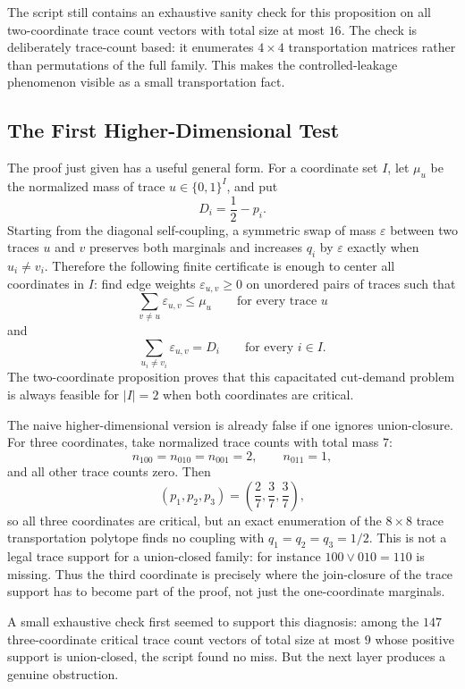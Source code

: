 \documentclass[11pt]{article}
\begin{document}
The script still contains an exhaustive sanity check for this proposition on
all two-coordinate trace count vectors with total size at most $16$.  The
check is deliberately trace-count based: it enumerates $4\times4$
transportation matrices rather than permutations of the full family.  This
makes the controlled-leakage phenomenon visible as a small transportation
fact.

\subsection{The First Higher-Dimensional Test}

The proof just given has a useful general form.  For a coordinate set $I$,
let $\mu_u$ be the normalized mass of trace $u\in\{0,1\}^I$, and put
\[
  D_i=\frac12-p_i.
\]
Starting from the diagonal self-coupling, a symmetric swap of mass
$\varepsilon$ between two traces $u$ and $v$ preserves both marginals and
increases $q_i$ by $\varepsilon$ exactly when $u_i\neq v_i$.  Therefore the
following finite certificate is enough to center all coordinates in $I$: find
edge weights $\varepsilon_{u,v}\geq0$ on unordered pairs of traces such that
\[
  \sum_{v\neq u}\varepsilon_{u,v}\leq \mu_u
  \qquad\text{for every trace }u
\]
and
\[
  \sum_{u_i\neq v_i}\varepsilon_{u,v}=D_i
  \qquad\text{for every }i\in I.
\]
The two-coordinate proposition proves that this capacitated cut-demand problem
is always feasible for $|I|=2$ when both coordinates are critical.

The naive higher-dimensional version is already false if one ignores
union-closure.
For three coordinates, take normalized trace counts with total mass $7$:
\[
  n_{100}=n_{010}=n_{001}=2,\qquad
  n_{011}=1,
\]
and all other trace counts zero.  Then
\[
  (p_1,p_2,p_3)=\left(\frac27,\frac37,\frac37\right),
\]
so all three coordinates are critical, but an exact enumeration of the
$8\times8$ trace transportation polytope finds no coupling with
$q_1=q_2=q_3=1/2$.  This is not a legal trace support for a union-closed
family: for instance $100\vee010=110$ is missing.  Thus the third coordinate
is precisely where the join-closure of the trace support has to become part
of the proof, not just the one-coordinate marginals.

A small exhaustive check first seemed to support this diagnosis: among the
$147$ three-coordinate critical trace count vectors of total size at most $9$
whose positive support is union-closed, the script found no miss.  But the
next layer produces a genuine obstruction.
\end{document}
